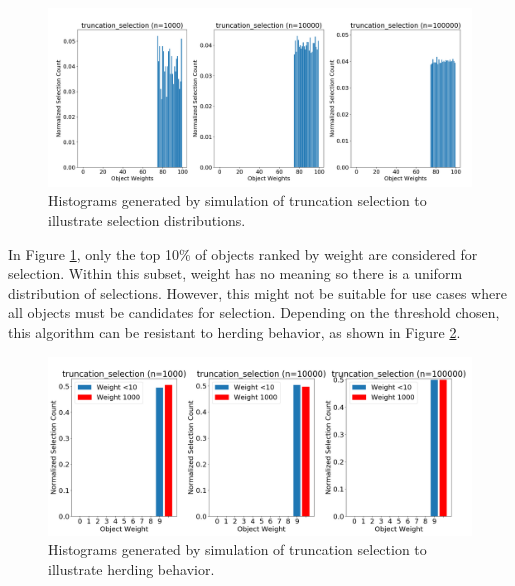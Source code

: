 \documentclass[12pt]{article}
\begin{document}
    \begin{figure}[htbp]
      \centering
      \includegraphics[scale=0.32]{images/herding_truncation.png} 
      \caption{Histograms generated by simulation of truncation selection
               to illustrate selection distributions.}
      \label{fig:herding_truncation}
    \end{figure}
    \FloatBarrier

    In Figure \ref{fig:herding_truncation}, only the top 10\% of objects ranked
    by weight are considered for selection. Within this subset, weight has no
    meaning so there is a uniform distribution of selections. However, this
    might not be suitable for use cases where all objects must be candidates
    for selection.  Depending on the threshold chosen, this algorithm can be
    resistant to herding behavior, as shown in Figure
    \ref{fig:pathological_truncation}. 

    \begin{figure}[htbp]
      \centering
      \includegraphics[scale=0.32]{images/pathological_truncation.png} 
      \caption{Histograms generated by simulation of truncation selection
               to illustrate herding behavior.}
      \label{fig:pathological_truncation}
    \end{figure}
    \FloatBarrier
\end{document}
